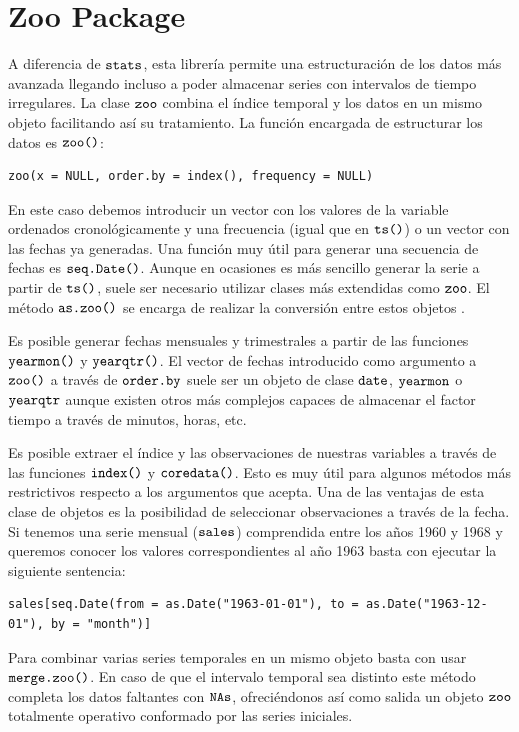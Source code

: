 \section{Zoo Package}
A diferencia de $\verb!stats!$, esta librería permite una estructuración de los datos más avanzada llegando incluso a poder almacenar series con intervalos de tiempo irregulares. La clase $\verb!zoo!$ combina el índice temporal y los datos en un mismo objeto facilitando así su tratamiento. La función encargada de estructurar los datos es $\verb!zoo()!$:
\begin{Verbatim}[fontsize=\footnotesize]
zoo(x = NULL, order.by = index(), frequency = NULL)
\end{Verbatim}

En este caso debemos introducir un vector con los valores de la variable ordenados cronológicamente y una frecuencia (igual que en $\verb!ts()!$) o un vector con las fechas ya generadas. Una función muy útil para generar una secuencia de fechas es $\verb!seq.Date()!$. Aunque en ocasiones es más sencillo generar la serie a partir de $\verb!ts()!$, suele ser necesario utilizar clases más extendidas como $\verb!zoo!$. El método $\verb!as.zoo()!$ se encarga de realizar la conversión entre estos objetos \cite{zoo}.

Es posible generar fechas mensuales y trimestrales a partir de las funciones $\verb!yearmon()!$ y $\verb!yearqtr()!$. El vector de fechas introducido como argumento a $\verb!zoo()!$ a través de $\verb!order.by!$ suele ser un objeto de clase $\verb!date!$, $\verb!yearmon!$ o $\verb!yearqtr!$ aunque existen otros más complejos capaces de almacenar el factor tiempo a través de minutos, horas, etc.

Es posible extraer el índice y las observaciones de nuestras variables a través de las funciones $\verb!index()!$ y $\verb!coredata()!$. Esto es muy útil para algunos métodos más restrictivos respecto a los argumentos que acepta. Una de las ventajas de esta clase de objetos es la posibilidad de seleccionar observaciones a través de la fecha. Si tenemos una serie mensual ($\verb!sales!$) comprendida entre los años 1960 y 1968 y queremos conocer los valores correspondientes al año 1963 basta con ejecutar la siguiente sentencia:
\begin{Verbatim}[fontsize=\footnotesize]
sales[seq.Date(from = as.Date("1963-01-01"), to = as.Date("1963-12-01"), by = "month")]
\end{Verbatim}

Para combinar varias series temporales en un mismo objeto basta con usar $\verb!merge.zoo()!$. En caso de que el intervalo temporal sea distinto este método completa los datos faltantes con $\verb!NAs!$, ofreciéndonos así como salida un objeto $\verb!zoo!$ totalmente operativo conformado por las series iniciales.

